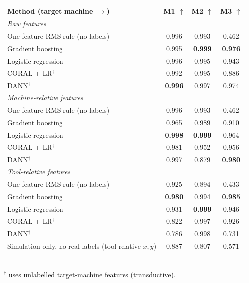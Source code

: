 \begin{tabular}{lccc}
\toprule
Method (target machine $\rightarrow$) & M1 $\uparrow$ & M2 $\uparrow$ & M3 $\uparrow$ \\
\midrule
\multicolumn{4}{l}{\textit{Raw features}} \\
\quad One-feature RMS rule (no labels) & 0.996 & 0.993 & 0.462 \\
\quad Gradient boosting & 0.995 & \cellcolor{gray!20}\textbf{0.999} & \cellcolor{gray!20}\textbf{0.976} \\
\quad Logistic regression & 0.996 & 0.995 & 0.943 \\
\quad CORAL + LR$^{\dagger}$ & 0.992 & 0.995 & 0.886 \\
\quad DANN$^{\dagger}$ & \cellcolor{gray!20}\textbf{0.996} & 0.997 & 0.974 \\
\midrule
\multicolumn{4}{l}{\textit{Machine-relative features}} \\
\quad One-feature RMS rule (no labels) & 0.996 & 0.993 & 0.462 \\
\quad Gradient boosting & 0.965 & 0.989 & 0.910 \\
\quad Logistic regression & \cellcolor{gray!20}\textbf{0.998} & \cellcolor{gray!20}\textbf{0.999} & 0.964 \\
\quad CORAL + LR$^{\dagger}$ & 0.981 & 0.952 & 0.956 \\
\quad DANN$^{\dagger}$ & 0.997 & 0.879 & \cellcolor{gray!20}\textbf{0.980} \\
\midrule
\multicolumn{4}{l}{\textit{Tool-relative features}} \\
\quad One-feature RMS rule (no labels) & 0.925 & 0.894 & 0.433 \\
\quad Gradient boosting & \cellcolor{gray!20}\textbf{0.980} & 0.994 & \cellcolor{gray!20}\textbf{0.985} \\
\quad Logistic regression & 0.931 & \cellcolor{gray!20}\textbf{0.999} & 0.946 \\
\quad CORAL + LR$^{\dagger}$ & 0.822 & 0.997 & 0.926 \\
\quad DANN$^{\dagger}$ & 0.786 & 0.998 & 0.731 \\
\midrule
Simulation only, no real labels (tool-relative $x,y$) & 0.887 & 0.807 & 0.571 \\
\bottomrule
\end{tabular}
\vspace{1pt}\\{\footnotesize $^{\dagger}$ uses unlabelled target-machine features (transductive).}

